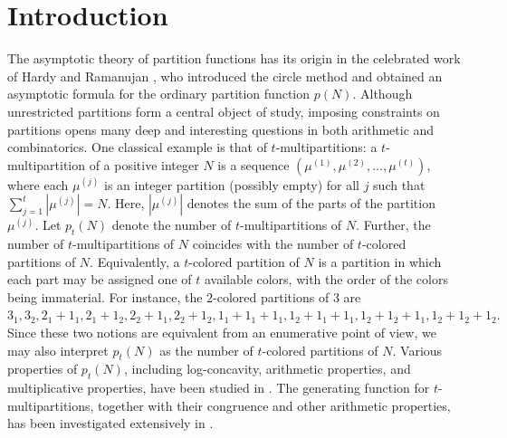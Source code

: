 \documentclass[11pt]{amsart}
\theoremstyle{plain}
\numberwithin{equation}{section}
\begin{document}
	\section{Introduction}\label{section1} 
	The asymptotic theory of partition functions has its origin in the celebrated work of Hardy and Ramanujan \cite{hardy1918asymptotic}, who introduced the circle method and obtained an asymptotic formula for the ordinary partition function $p(N)$. 
	Although unrestricted partitions form a central object of study, imposing constraints on partitions opens many deep and interesting questions in both arithmetic and combinatorics.
	One classical example is that of $t$-multipartitions: a $t$-multipartition of a positive integer $N$ is a sequence $\left(\mu^{(1)},\mu^{(2)},\ldots,\mu^{(t)}\right)$, where each $\mu^{(j)}$ is an integer partition (possibly empty) for all $j$ such that $\sum_{j=1}^{t}\left|\mu^{(j)}\right|=N$. Here, $\left|\mu^{(j)}\right|$ denotes the sum of the parts of the partition $\mu^{(j)}$. Let $p_{t}(N)$ denote the number of $t$-multipartitions of $N$. Further, the number of $t$-multipartitions of $N$ coincides with the number of $t$-colored partitions of $N$. Equivalently, a $t$-colored partition of $N$ is a partition in which each part may be assigned one of $t$ available colors, with the order of the colors being immaterial. For instance, the $2$-colored partitions of $3$ are $3_1, 3_2, 2_1+1_1, 2_1+1_2, 2_2+1_1,2_2+1_2,1_1+1_1+1_1, 1_2+1_1+1_1, 1_2+1_2+1_1, 1_2+1_2+1_2.$ 
	Since these two notions are equivalent from an enumerative point of view, we may also interpret $p_t(N)$ as the number of $t$-colored partitions of $N$. Various properties of $p_t(N)$, including log-concavity, arithmetic properties, and multiplicative properties, have been studied in \cite{bringmann, bringmann1, chern}. The generating function for $t$-multipartitions, together with their congruence and other arithmetic properties, has been investigated extensively in \cite{andrews, atkin, chen2014}. 
	
\end{document}
